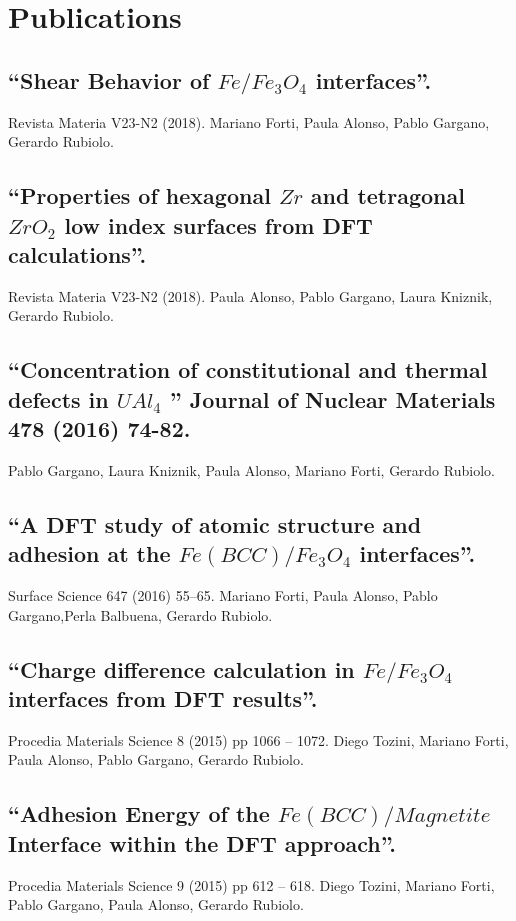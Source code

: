 \section{Publications}

\subsection{“Shear Behavior of $Fe/Fe_3O_4$ interfaces”. } Revista Materia V23-N2 (2018). Mariano Forti, Paula Alonso, Pablo Gargano, Gerardo Rubiolo. 

\subsection{“Properties of hexagonal $Zr$ and tetragonal $ZrO_2$ low index surfaces from DFT calculations”. } Revista Materia V23-N2 (2018). Paula Alonso, Pablo Gargano, Laura Kniznik, Gerardo Rubiolo. 

\subsection{“Concentration of constitutional and thermal defects in $UAl_4$ ” Journal of Nuclear Materials 478 (2016) 74-82. } Pablo Gargano, Laura Kniznik, Paula Alonso, Mariano Forti, Gerardo Rubiolo.

\subsection{“A DFT study of atomic structure and adhesion at the $Fe(BCC)/Fe_3 O_4$ interfaces”. } Surface Science 647 (2016) 55–65. Mariano Forti, Paula Alonso, Pablo Gargano,Perla Balbuena, Gerardo Rubiolo.

\subsection{“Charge difference calculation in $Fe/Fe_3O_4$ interfaces from DFT results”. } Procedia Materials Science 8 (2015) pp 1066 – 1072. Diego Tozini, Mariano Forti, Paula Alonso, Pablo Gargano, Gerardo Rubiolo.

\subsection{“Adhesion Energy of the $Fe(BCC)/Magnetite$ Interface within the DFT approach”. } Procedia Materials Science 9 (2015) pp 612 – 618. Diego Tozini, Mariano Forti, Pablo Gargano, Paula Alonso, Gerardo Rubiolo. 

